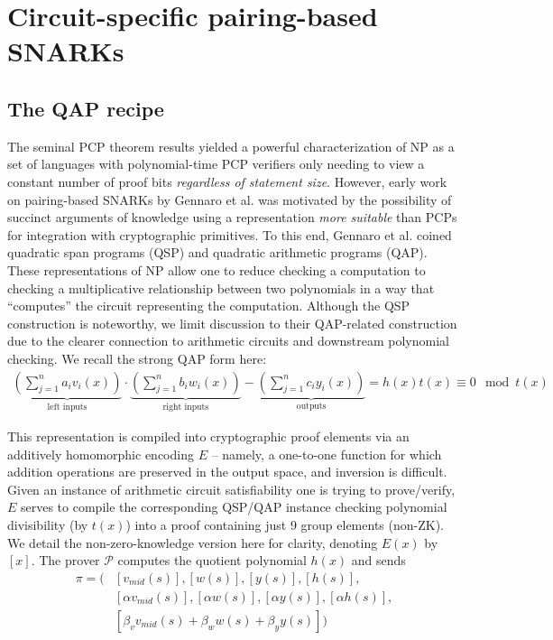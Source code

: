 \section{Circuit-specific pairing-based SNARKs}
\subsection{The QAP recipe}
\noindent The seminal PCP theorem results \cite{pcpthm1, pcpthm2} yielded a powerful characterization of NP as a set of languages with polynomial-time PCP verifiers only needing to view a constant number of proof bits \textit{regardless of statement size}. However, early work on pairing-based SNARKs by Gennaro et al. \cite{snarknopcp} was motivated by the possibility of succinct arguments of knowledge using a representation \textit{more suitable} than PCPs for integration with cryptographic primitives. To this end, Gennaro et al. \cite{snarknopcp} coined quadratic span programs (QSP) and quadratic arithmetic programs (QAP). These representations of NP allow one to reduce checking a computation to checking a multiplicative relationship between two polynomials in a way that ``computes'' the circuit representing the computation. Although the QSP construction is noteworthy, we limit discussion to their QAP-related construction due to the clearer connection to arithmetic circuits and downstream polynomial checking. We recall the strong QAP form here:
\begin{align}
\underbrace{\left(\sum_{j=1}^n a_i v_i(x)\right)}_{\text{left inputs}} \cdot \underbrace{\left(\sum_{j=1}^n b_i w_i(x)\right)}_{\text{right inputs}} - \underbrace{\left(\sum_{j=1}^n c_i y_i(x)\right)}_{\text{outputs}} = h(x) t(x) \equiv 0 \mod t(x)
\end{align}

\noindent This representation is compiled into cryptographic proof elements via an additively homomorphic encoding $E$ -- namely, a one-to-one function for which addition operations are preserved in the output space, and inversion is difficult. Given an instance of arithmetic circuit satisfiability one is trying to prove/verify, $E$ serves to compile the corresponding QSP/QAP instance checking polynomial divisibility (by $t(x)$) into a proof containing just 9 group elements (non-ZK). We detail the non-zero-knowledge version here for clarity, denoting $E(x)$ by $[x]$. The prover $\mathcal{P}$ computes the quotient polynomial $h(x)$ and sends
\begin{align*}
    \pi = \Big(&[v_{mid}(s)], [w(s)], [y(s)], [h(s)], \\ 
    &[\alpha v_{mid}(s)], [\alpha w(s)], [\alpha y(s)], [\alpha h(s)], \\ 
    &[\beta_v v_{mid}(s) + \beta_w w(s) + \beta_y y(s)]\Big)
\end{align*}

